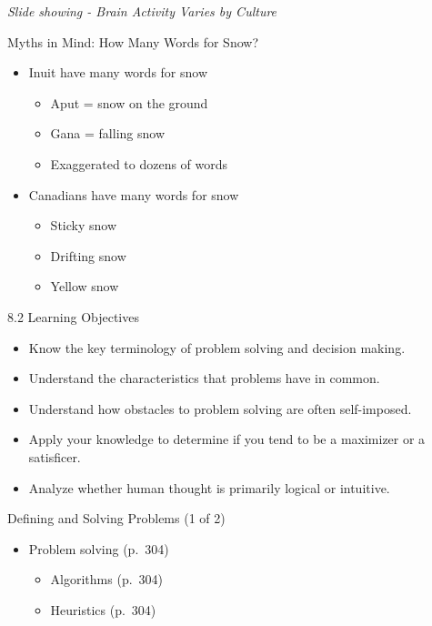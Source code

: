 \documentclass[
]{book}
\providecommand{\tightlist}{%
  \setlength{\itemsep}{0pt}\setlength{\parskip}{0pt}}
\begin{document}
\emph{Slide showing - Brain Activity Varies by Culture}

Myths in Mind: How Many Words for Snow?

\begin{itemize}
\tightlist
\item
  Inuit have many words for snow

  \begin{itemize}
  \tightlist
  \item
    Aput = snow on the ground\\
  \item
    Gana = falling snow\\
  \item
    Exaggerated to dozens of words\\
  \end{itemize}
\item
  Canadians have many words for snow

  \begin{itemize}
  \tightlist
  \item
    Sticky snow\\
  \item
    Drifting snow\\
  \item
    Yellow snow
  \end{itemize}
\end{itemize}

8.2 Learning Objectives

\begin{itemize}
\tightlist
\item
  Know the key terminology of problem solving and decision making.\\
\item
  Understand the characteristics that problems have in common.\\
\item
  Understand how obstacles to problem solving are often self-imposed.\\
\item
  Apply your knowledge to determine if you tend to be a maximizer or a satisficer.\\
\item
  Analyze whether human thought is primarily logical or intuitive.
\end{itemize}

Defining and Solving Problems (1 of 2)

\begin{itemize}
\tightlist
\item
  Problem solving (p.~304)

  \begin{itemize}
  \tightlist
  \item
    Algorithms (p.~304)\\
  \item
    Heuristics (p.~304)
  \end{itemize}
\end{itemize}
\end{document}
